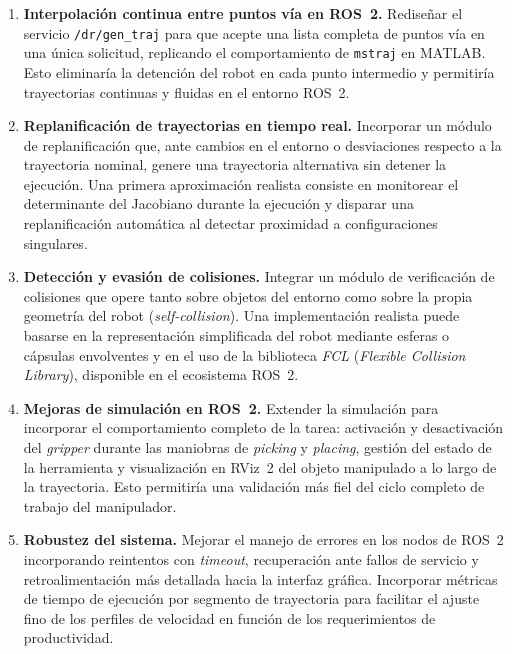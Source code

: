 \documentclass{article}
\begin{document}
\begin{enumerate}

    \item \textbf{Interpolación continua entre puntos vía en ROS~2.} Rediseñar el servicio \texttt{/dr/gen\_traj} para que acepte una lista completa de puntos vía en una única solicitud, replicando el comportamiento de \texttt{mstraj} en MATLAB. Esto eliminaría la detención del robot en cada punto intermedio y permitiría trayectorias continuas y fluidas en el entorno ROS~2.

    \item \textbf{Replanificación de trayectorias en tiempo real.} Incorporar un módulo de replanificación que, ante cambios en el entorno o desviaciones respecto a la trayectoria nominal, genere una trayectoria alternativa sin detener la ejecución. Una primera aproximación realista consiste en monitorear el determinante del Jacobiano durante la ejecución y disparar una replanificación automática al detectar proximidad a configuraciones singulares.

    \item \textbf{Detección y evasión de colisiones.} Integrar un módulo de verificación de colisiones que opere tanto sobre objetos del entorno como sobre la propia geometría del robot (\textit{self-collision}). Una implementación realista puede basarse en la representación simplificada del robot mediante esferas o cápsulas envolventes y en el uso de la biblioteca \textit{FCL} (\textit{Flexible Collision Library}), disponible en el ecosistema ROS~2.

    \item \textbf{Mejoras de simulación en ROS~2.} Extender la simulación para incorporar el comportamiento completo de la tarea: activación y desactivación del \textit{gripper} durante las maniobras de \textit{picking} y \textit{placing}, gestión del estado de la herramienta y visualización en RViz~2 del objeto manipulado a lo largo de la trayectoria. Esto permitiría una validación más fiel del ciclo completo de trabajo del manipulador.

    \item \textbf{Robustez del sistema.} Mejorar el manejo de errores en los nodos de ROS~2 incorporando reintentos con \textit{timeout}, recuperación ante fallos de servicio y retroalimentación más detallada hacia la interfaz gráfica. Incorporar métricas de tiempo de ejecución por segmento de trayectoria para facilitar el ajuste fino de los perfiles de velocidad en función de los requerimientos de productividad.


\end{enumerate}
\end{document}
